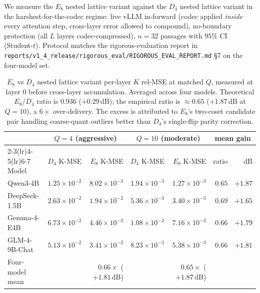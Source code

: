 \documentclass[10pt,a4paper]{article}
\theoremstyle{definition}
\theoremstyle{plain}
\begin{document}
We measure the $E_8$ nested lattice variant against the $D_4$ nested lattice variant in the harshest-for-the-codec regime: live
vLLM in-forward (codec applied \emph{inside} every attention step,
cross-layer error allowed to compound), no-boundary protection (all
$L$ layers codec-compressed), $n = 32$ passages with $95\%$ CI
(Student-$t$). Protocol matches the rigorous-evaluation report in \texttt{reports/v1\_4\_release/rigorous\_eval/RIGOROUS\_EVAL\_REPORT.md} \S 7
on the four-model set.

\begin{table}[H]
\centering
\small
\caption{$E_8$ vs $D_4$ nested lattice variant per-layer $K$ rel-MSE at matched $Q$, measured
at layer 0 before cross-layer accumulation. Averaged across four
models. Theoretical $E_8$/$D_4$ ratio is $0.936$ ($+0.29\,$dB); the
empirical ratio is $\approx 0.65$ ($+1.87\,$dB at $Q=10$), a
$6\times$ over-delivery. The excess is attributed to $E_8$'s
two-coset candidate pair handling coarse-quant outliers better than
$D_4$'s single-flip parity correction.}
\label{tab:v15-kmse}
\begin{tabular}{lrrrrrr}
  \toprule
   & \multicolumn{2}{c}{$Q=4$ (aggressive)} & \multicolumn{2}{c}{$Q=10$ (moderate)} & \multicolumn{2}{c}{mean gain} \\
  \cmidrule(lr){2-3}\cmidrule(lr){4-5}\cmidrule(lr){6-7}
  Model & $D_4$ K-MSE & $E_8$ K-MSE & $D_4$ K-MSE & $E_8$ K-MSE & ratio & dB \\
  \midrule
  Qwen3-4B        & $1.25\times 10^{-2}$ & $8.02\times 10^{-3}$ & $1.94\times 10^{-3}$ & $1.27\times 10^{-3}$ & $0.65$ & $+1.87$ \\
  DeepSeek-1.5B   & $2.63\times 10^{-2}$ & $1.94\times 10^{-2}$ & $5.36\times 10^{-3}$ & $3.40\times 10^{-3}$ & $0.69$ & $+1.65$ \\
  Gemma-4-E4B     & $6.73\times 10^{-2}$ & $4.46\times 10^{-2}$ & $1.08\times 10^{-2}$ & $7.16\times 10^{-3}$ & $0.66$ & $+1.79$ \\
  GLM-4-9B-Chat   & $5.13\times 10^{-2}$ & $3.41\times 10^{-2}$ & $8.23\times 10^{-3}$ & $5.38\times 10^{-3}$ & $0.66$ & $+1.81$ \\
  \midrule
  Four-model mean &             & $0.66\times$ ($+1.81\,$dB) &             & $0.65\times$ ($+1.87\,$dB) & & \\
  \bottomrule
\end{tabular}
\end{table}
\end{document}
